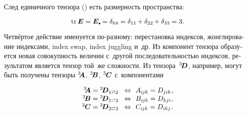 \begin{otherlanguage}{russian}
\vspace{-0.16em} След единичного тензора () есть размерность пространства:

\nopagebreak\vspace{-0.2em}\begin{equation*}
\operatorname{tr} \bm{E} = \bm{E}\tracedot = \delta_{kk} \hspace{-0.2ex} = \delta_{11} \hspace{-0.2ex} + \delta_{22} \hspace{-0.2ex} + \delta_{33} \hspace{-0.1ex} = 3.
\end{equation*}

Четвёртое действие именуется по\hbox{-}разному: перестановка индексов, жонглирование индексами, index swap, index juggling и~др.
Из компонент тензора образуется новая совокупность величин с~другой последовательностью индексов, результатом является тензор той~же сложности.
Из тензора~${^3\hspace{-0.16em}\bm{D}}$, например, могут быть получены тензоры ${^3\hspace{-0.28em}\bm{A}}$, ${^3\hspace{-0.15em}\bm{B}}$, ${^3\hspace{-0.05em}\bm{C}}$ с~компонентами

\nopagebreak\vspace{-0.16em}\begin{equation}\label{action:4}
\begin{array}{rcl}
{^3\hspace{-0.28em}\bm{A}} = {^3\hspace{-0.16em}\bm{D}}_{1 \scalebox{0.6}[0.8]{$\rightleftarrows$} 2}
& \!\Leftrightarrow\!\! &
A_{i\hspace{-0.1ex}jk} = D_{jik} \hspace{.1ex},
\\
{^3\hspace{-0.15em}\bm{B}} = {^3\hspace{-0.16em}\bm{D}}_{1 \scalebox{0.6}[0.8]{$\rightleftarrows$} 3}
& \!\Leftrightarrow\!\! & B_{i\hspace{-0.1ex}jk} = D_{kji} \hspace{.1ex},
\\
{^3\hspace{-0.05em}\bm{C}} = {^3\hspace{-0.16em}\bm{D}}_{2 \scalebox{0.6}[0.8]{$\rightleftarrows$} 3}
& \!\Leftrightarrow\!\! & C_{i\hspace{-0.1ex}jk} = D_{ikj} \hspace{.1ex}.
\end{array}
\end{equation}


\end{otherlanguage}
